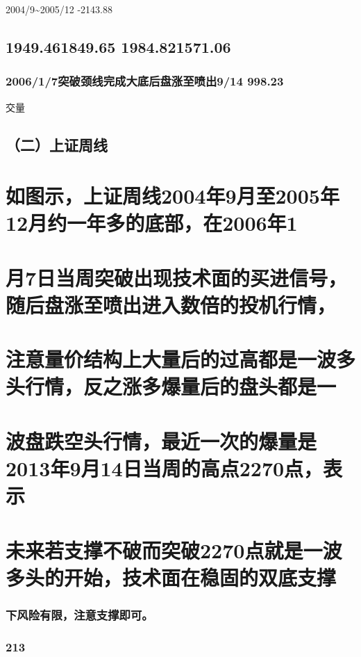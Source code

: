 \documentclass{article}
\begin{document}
2004/9\textasciitilde{}2005/12 -2143.88

\subsection{1949.461849.65 1984.821571.06}

\subsubsection{2006/1/7突破颈线完成大底后盘涨至喷出9/14 998.23}

交量

\subsection{（二）上证周线}

\section{如图示，上证周线2004年9月至2005年12月约一年多的底部，在2006年1}

\section{月7日当周突破出现技术面的买进信号，随后盘涨至喷出进入数倍的投机行情，}

\section{注意量价结构上大量后的过高都是一波多头行情，反之涨多爆量后的盘头都是一}

\section{波盘跌空头行情，最近一次的爆量是2013年9月14日当周的高点2270点，表示}

\section{未来若支撑不破而突破2270点就是一波多头的开始，技术面在稳固的双底支撑}

\subsubsection{下风险有限，注意支撑即可。}

\subsubsection{213}
\end{document}
